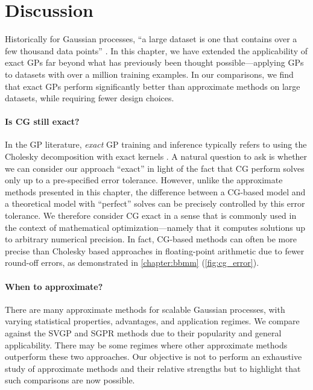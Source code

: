 \section{Discussion}

Historically for Gaussian processes, ``a large dataset is one that contains over a few thousand data points'' \citep{hensman2013gaussian}.
In this chapter, we have extended the applicability of exact GPs far beyond what has previously been thought possible---applying GPs to datasets with over a million training examples.
In our comparisons, we find that exact GPs perform significantly better than approximate methods on large datasets, while requiring fewer design choices.

\paragraph{Is CG still exact?}
In the GP literature, \emph{exact} GP training and inference typically refers to using the Cholesky decomposition with exact kernels \citep{rasmussen2006gaussian}.
A natural question to ask is whether we can consider our approach ``exact'' in light of the fact that CG perform solves only up to a pre-specified error tolerance.
However, unlike the approximate methods presented in this chapter, the difference between a CG-based model and a theoretical model with ``perfect'' solves can be precisely controlled by this error tolerance.
We therefore consider CG exact in a sense that is commonly used in the context of mathematical optimization---namely that it computes solutions up to arbitrary numerical precision.
In fact, CG-based methods can often be more precise than Cholesky based approaches in floating-point arithmetic due to fewer round-off errors, as demonstrated in \cref{chapter:bbmm} (\cref{fig:cg_error}).

\paragraph{When to approximate?}
There are many approximate methods for scalable Gaussian processes, with varying statistical properties, advantages, and application regimes.
We compare against the SVGP and SGPR methods due to their popularity and general applicability.
There may be some regimes where other approximate methods outperform these two approaches.
Our objective is not to perform an exhaustive study of approximate methods and their relative strengths but to highlight that such comparisons are now possible.

